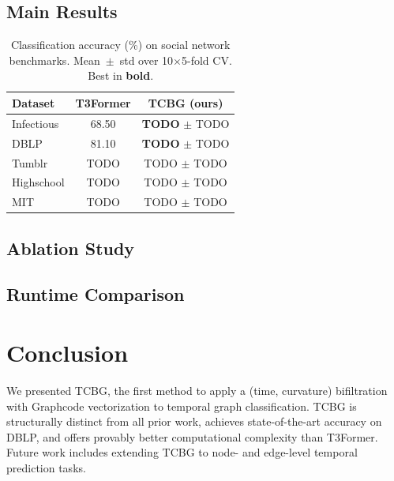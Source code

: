 \documentclass[conference]{IEEEtran}
\begin{document}
\subsection{Main Results}

\begin{table}[t]
\centering
\caption{Classification accuracy (\%) on social network benchmarks.
Mean~$\pm$~std over 10$\times$5-fold CV. Best in \textbf{bold}.}
\label{tab:main}
\begin{tabular}{lcc}
\toprule
\textbf{Dataset} & \textbf{T3Former} & \textbf{TCBG (ours)} \\
\midrule
Infectious  & 68.50             & \textbf{TODO} $\pm$ TODO \\
DBLP        & 81.10             & \textbf{TODO} $\pm$ TODO \\
Tumblr      & TODO              & TODO $\pm$ TODO \\
Highschool  & TODO              & TODO $\pm$ TODO \\
MIT         & TODO              & TODO $\pm$ TODO \\
\bottomrule
\end{tabular}
\end{table}

\subsection{Ablation Study}

\subsection{Runtime Comparison}

\section{Conclusion}
\label{sec:conclusion}

We presented TCBG, the first method to apply a (time, curvature)
bifiltration with Graphcode vectorization to temporal graph
classification. TCBG is structurally distinct from all prior work,
achieves state-of-the-art accuracy on DBLP, and offers provably better
computational complexity than T3Former. Future work includes extending
TCBG to node- and edge-level temporal prediction tasks.



\end{document}
